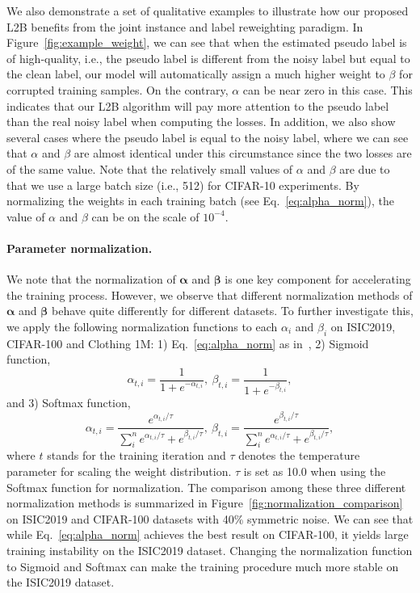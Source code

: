 \documentclass{article}
\begin{document}
We also demonstrate a set of qualitative examples to illustrate how our proposed L2B benefits from the joint instance and label reweighting paradigm. 
In Figure~\ref{fig:example_weight}, we can see that when the estimated  pseudo label is of high-quality, i.e., the pseudo label is different from the noisy label but equal to the clean label, our model will automatically assign a much higher weight to $\beta$ for corrupted training samples. On the contrary, $\alpha$ can be near zero in this case. This indicates that our L2B algorithm will pay more attention to the pseudo label than the real noisy label when computing the losses.
In addition, we also show several cases where the pseudo label is equal to the noisy label, where we can see that $\alpha$ and $\beta$ are almost identical under this circumstance since the two losses are of the same value. 
Note that the relatively small values of $\alpha$ and $\beta$ are due to that we use a large batch size (i.e., 512) for CIFAR-10 experiments. By normalizing the weights in each training batch (see Eq.~\eqref{eq:alpha_norm}), the value of $\alpha$ and $\beta$ can be on the scale of $10^{-4}$.






\paragraph{Parameter normalization.}
We note that the normalization of $\boldsymbol{\alpha}$ and $\boldsymbol{\beta}$ is one key component for accelerating the training process.
However, we observe that different normalization methods of $\boldsymbol{\alpha}$ and $\boldsymbol{\beta}$ behave quite differently for different datasets. 
To further investigate this, we apply the following normalization functions to each $\alpha_i$ and $\beta_i$ on ISIC2019, CIFAR-100 and Clothing 1M: 1) Eq.~\eqref{eq:alpha_norm} as in~\cite{ren2018learning}, 2) Sigmoid function,
\begin{equation}\label{eq:sigmoid_ISIC}
\alpha_{t,i}=\frac{1}{1 + e^{-\alpha_{t,i}}},\ \beta_{t,i}=\frac{1}{1 + e^{-\beta_{t,i}}},
\end{equation}
and 3) Softmax function,
\begin{equation}\label{eq:softmax_ISIC}
\alpha_{t,i}=\frac{e^{\alpha_{t,i}/\tau}}
{\sum_i^n e^{\alpha_{t,i}/\tau}+e^{\beta_{t,i}/\tau}},\ \beta_{t,i}=\frac{e^{\beta_{t,i}/\tau}}{\sum_i^n e^{\alpha_{t,i}/\tau}+e^{\beta_{t,i}/\tau}},
\end{equation}
where $t$ stands for the training iteration and $\tau$ denotes the temperature parameter for scaling the weight distribution. 
$\tau$ is set as 10.0 when using the Softmax function for normalization.
The comparison among these three different normalization methods is summarized in Figure~\ref{fig:normalization_comparison} on ISIC2019 and CIFAR-100 datasets with 40\% symmetric noise. 
We can see that while Eq.~\eqref{eq:alpha_norm} achieves the best result on CIFAR-100, it yields large training instability on the ISIC2019 dataset. Changing the normalization function to Sigmoid and Softmax can make the training procedure much more stable on the ISIC2019 dataset. 
\end{document}
